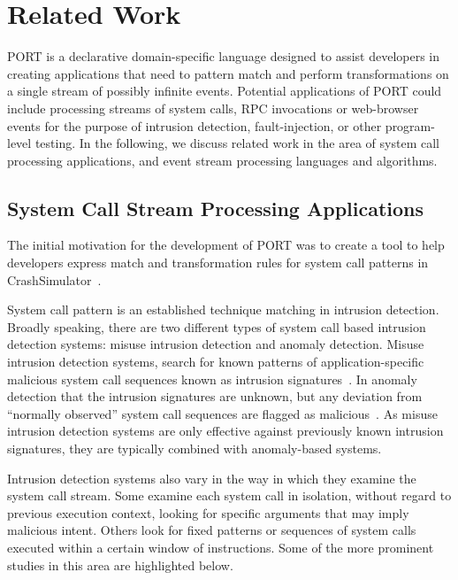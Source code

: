 \section{Related Work}
\label{SEC:related-work}

PORT is a declarative domain-specific language designed to
assist developers in creating
applications that need to pattern match and perform
transformations on a single stream of possibly infinite events.
Potential applications
of PORT could include
processing streams of system calls, RPC invocations or
web-browser events for the purpose of intrusion detection, fault-injection, or
other program-level testing. In the following, we discuss
related work in the area of system call processing applications,
and event stream processing languages and algorithms.

\subsection{System Call Stream Processing Applications}
The
initial motivation for the development of PORT was to create a tool to help
developers express match and transformation rules for system call patterns in
CrashSimulator~\cite{DBLP:conf/issre/MooreCFW19}.

System call pattern
is an established technique
matching in intrusion detection.
Broadly speaking, there are two
different types of system call based intrusion detection systems: misuse
intrusion detection and anomaly detection. Misuse intrusion
detection systems,
search for known patterns of application-specific malicious system call
sequences known as intrusion signatures~\cite{GARCIATEODORO200918}.
In anomaly
detection that the intrusion signatures are unknown,
but any deviation
from “normally observed” system call sequences are flagged as
malicious~\cite{DBLP:conf/sp/ForrestHSL96}.
As misuse intrusion detection systems are only
effective against previously known intrusion signatures,
they are typically combined with anomaly-based systems.

Intrusion
detection systems also vary in the way in which they examine the system call
stream.
Some examine each system call in isolation,
without regard to previous
execution context,
looking for specific arguments that may imply malicious
intent.
Others look for fixed patterns or sequences of system calls executed
within a certain window of instructions.  Some of the more prominent studies in
this area are highlighted below.

